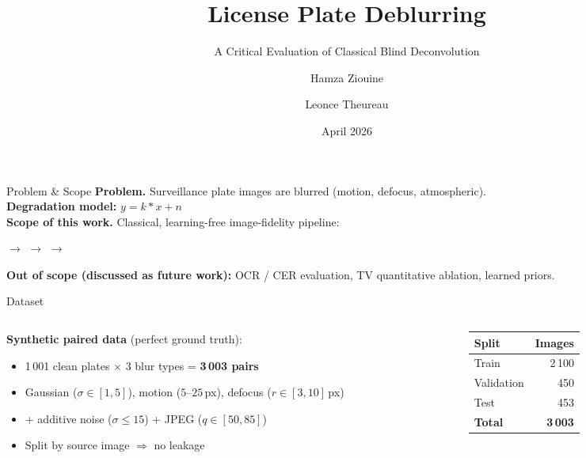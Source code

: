 \documentclass[aspectratio=169,11pt]{beamer}
\title{License Plate Deblurring}
\subtitle{A Critical Evaluation of Classical Blind Deconvolution}
\author{Hamza Ziouine \and Leonce Theureau}
\institute{Universit\'e Internationale de Rabat --- Group Opus}
\date{April 2026}
\begin{document}
\begin{frame}
\titlepage
\end{frame}

\begin{frame}{Problem \& Scope}
\textbf{Problem.} Surveillance plate images are blurred
(motion, defocus, atmospheric). \\[0.2cm]

\textbf{Degradation model:} \quad $y = k \ast x + n$ \\[0.2cm]

\textbf{Scope of this work.} Classical, learning-free image-fidelity pipeline:

\vspace{0.2cm}
\begin{center}
\small
{} $\rightarrow$
 $\rightarrow$
 $\rightarrow$
\end{center}

\vspace{0.3cm}
\textbf{Out of scope (discussed as future work):} OCR / CER evaluation,
TV quantitative ablation, learned priors.
\end{frame}

\begin{frame}{Dataset}
\begin{columns}
\begin{column}{0.55\textwidth}
\textbf{Synthetic paired data} (perfect ground truth):
\begin{itemize}
  \item 1\,001 clean plates $\times$ 3 blur types = \textbf{3\,003 pairs}
  \item Gaussian ($\sigma \in [1,5]$), motion ($5$--$25$\,px), defocus ($r \in [3,10]$\,px)
  \item + additive noise ($\sigma \leq 15$) + JPEG ($q \in [50, 85]$)
  \item Split by source image $\Rightarrow$ no leakage
\end{itemize}
\end{column}
\begin{column}{0.4\textwidth}
\begin{tabular}{lr}
\toprule
Split & Images \\
\midrule
Train & 2\,100 \\
Validation & 450 \\
Test & 453 \\
\midrule
\textbf{Total} & \textbf{3\,003} \\
\bottomrule
\end{tabular}
\end{column}
\end{columns}
\end{frame}
\end{document}

